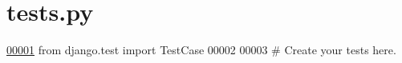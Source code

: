\hypertarget{tests_8py_source}{}\section{tests.\+py}
\label{tests_8py_source}

\begin{DoxyCode}
\hypertarget{tests_8py_source_l00001}{}\hyperlink{namespacecivilsage_1_1tests}{00001} \textcolor{keyword}{from} django.test \textcolor{keyword}{import} TestCase
00002 
00003 \textcolor{comment}{# Create your tests here.}
\end{DoxyCode}
